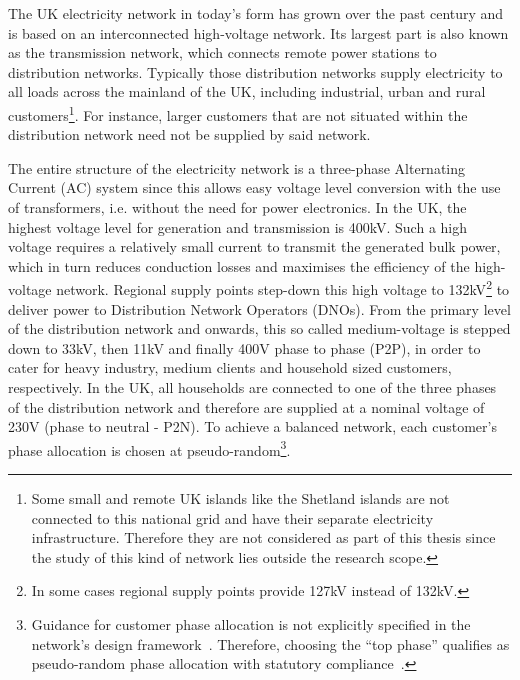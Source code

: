 The UK electricity network in today's form has grown over the past century and is based on an interconnected high-voltage network.
Its largest part is also known as the transmission network, which connects remote power stations to distribution networks.
Typically those distribution networks supply electricity to all loads across the mainland of the UK, including industrial, urban and rural customers\footnote{Some small and remote UK islands like the Shetland islands are not connected to this national grid and have their separate electricity infrastructure. Therefore they are not considered as part of this thesis since the study of this kind of network lies outside the research scope.}. For instance, larger customers that are not situated within the distribution network need not be supplied by said network.

The entire structure of the electricity network is a three-phase Alternating Current (AC) system since this allows easy voltage level conversion with the use of transformers, i.e. without the need for power electronics.
In the UK, the highest voltage level for generation and transmission is 400kV.
Such a high voltage requires a relatively small current to transmit the generated bulk power, which in turn reduces conduction losses and maximises the efficiency of the high-voltage network.
Regional supply points step-down this high voltage to 132kV\footnote{In some cases regional supply points provide 127kV instead of 132kV.} to deliver power to Distribution Network Operators (DNOs).
From the primary level of the distribution network and onwards, this so called medium-voltage is stepped down to 33kV, then 11kV and finally 400V phase to phase (P2P), in order to cater for heavy industry, medium clients and household sized customers, respectively.
In the UK, all households are connected to one of the three phases of the distribution network and therefore are supplied at a nominal voltage of 230V (phase to neutral - P2N).
To achieve a balanced network, each customer's phase allocation is chosen at pseudo-random\footnote{Guidance for customer phase allocation is not explicitly specified in the network's design framework~\cite{UKPowerNetworks2014}. Therefore, choosing the ``top phase'' qualifies as pseudo-random phase allocation with statutory compliance~\cite{StatutoryInstruments2015}.}.


